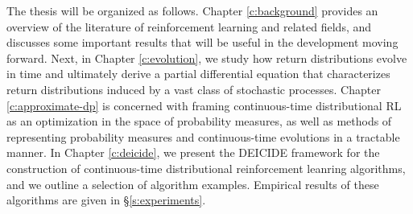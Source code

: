 The thesis will be organized as follows. Chapter \ref{c:background}
provides an overview of the literature of reinforcement learning and
related fields, and discusses some important results that will be
useful in the development moving forward. Next, in Chapter
\ref{c:evolution}, we study how return distributions evolve in time
and ultimately derive a partial differential equation that
characterizes return distributions induced by a vast class of
stochastic processes. Chapter \ref{c:approximate-dp} is concerned with
framing continuous-time distributional RL as an optimization in the
space of probability measures, as well as methods of representing
probability measures and continuous-time evolutions in a tractable
manner. In Chapter \ref{c:deicide}, we present the DEICIDE framework
for the construction of continuous-time distributional reinforcement
leanring algorithms, and we outline a selection of algorithm
examples. Empirical results of these algorithms are given in \S\ref{s:experiments}.
